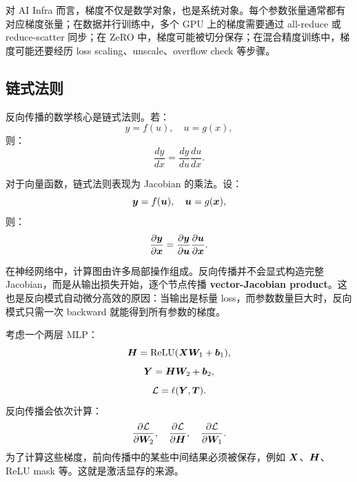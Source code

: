 对 AI Infra 而言，梯度不仅是数学对象，也是系统对象。每个参数张量通常都有对应梯度张量；在数据并行训练中，多个 GPU 上的梯度需要通过 all-reduce 或 reduce-scatter 同步；在 ZeRO 中，梯度可能被切分保存；在混合精度训练中，梯度可能还要经历 loss scaling、unscale、overflow check 等步骤。

\subsection{链式法则}
\label{subsec:chain-rule}

反向传播的数学核心是链式法则。若：
\[
  y=f(u),\quad u=g(x),
\]
则：
\[
  \frac{dy}{dx}
  =
  \frac{dy}{du}
  \frac{du}{dx}.
\]

对于向量函数，链式法则表现为 Jacobian 的乘法。设：
\[
  \bm{y}=f(\bm{u}),\quad \bm{u}=g(\bm{x}),
\]
则：
\[
  \frac{\partial \bm{y}}{\partial \bm{x}}
  =
  \frac{\partial \bm{y}}{\partial \bm{u}}
  \frac{\partial \bm{u}}{\partial \bm{x}}.
\]

在神经网络中，计算图由许多局部操作组成。反向传播并不会显式构造完整 Jacobian，而是从输出损失开始，逐个节点传播 \textbf{vector-Jacobian product}。这也是反向模式自动微分高效的原因：当输出是标量 loss，而参数数量巨大时，反向模式只需一次 backward 就能得到所有参数的梯度。

考虑一个两层 MLP：
\[
  \bm{H}=\operatorname{ReLU}(\bm{X}\bm{W}_1+\bm{b}_1),
\]
\[
  \bm{Y}=\bm{H}\bm{W}_2+\bm{b}_2,
\]
\[
  \mathcal{L}=\ell(\bm{Y},\bm{T}).
\]
反向传播会依次计算：
\[
  \frac{\partial \mathcal{L}}{\partial \bm{W}_2},
  \quad
  \frac{\partial \mathcal{L}}{\partial \bm{H}},
  \quad
  \frac{\partial \mathcal{L}}{\partial \bm{W}_1}.
\]
为了计算这些梯度，前向传播中的某些中间结果必须被保存，例如 $\bm{X}$、$\bm{H}$、ReLU mask 等。这就是激活显存的来源。

